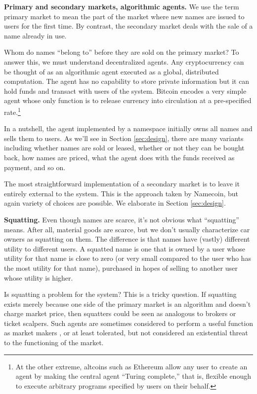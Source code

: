 {\bf Primary and secondary markets, algorithmic agents.} We use the term primary market to mean the part of the market where new names are issued to users for the first time. By contrast, the secondary market deals with the sale of a name already in use. 

Whom do names ``belong to'' before they are sold on the primary market? To answer this, we must understand decentralized agents. Any cryptocurrency can be thought of as an algorithmic agent executed as a global, distributed computation. The agent has no capability to store private information but it can hold funds and transact with users of the system. Bitcoin encodes a very simple agent whose only function is to release currency into circulation at a pre-specified rate.\footnote{At the other extreme, altcoins such as Ethereum allow any user to create an agent by making the central agent ``Turing complete,'' that is, flexible enough to execute arbitrary programs specified by users on their behalf.} 

In a nutshell, the agent implemented by a namespace initially owns all names and sells them to users. As we'll see in Section \ref{sec:design}, there are many variants including whether names are sold or leased, whether or not they can be bought back, how names are priced, what the agent does with the funds received as payment, and so on.

The most straightforward implementation of a secondary market is to leave it entirely external to the system. This is the approach taken by Namecoin, but again variety of choices are possible. We elaborate in Section \ref{sec:design}.

{\bf Squatting.} Even though names are scarce, it's not obvious what ``squatting'' means. After all, material goods are scarce, but we don't usually characterize car owners as squatting on them. The difference is that names have (vastly) different utility to different users. A squatted name is one that is owned by a user whose utility for that name is close to zero (or very small compared to the user who has the most utility for that name), purchased in hopes of selling to another user whose utility is higher.

Is squatting a problem for the system? This is a tricky question. If squatting exists merely because one side of the primary market is an algorithm and doesn't charge market price, then squatters could be seen as analogous to brokers or ticket scalpers. Such agents are sometimes considered to perform a useful function as market makers \cite{silber1984marketmaker}, or at least tolerated, but not considered an existential threat to the functioning of the market.

